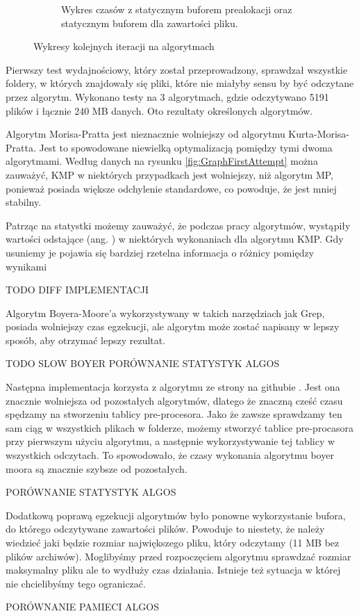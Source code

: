 \begin{figure}
\begin{subfigure}{0.8\textwidth}
    \caption{Wykres czasów z statycznym buforem prealokacji oraz statycznym buforem
    dla zawartości pliku.}
    \label{fig:GraphStaticPreallocAndFileBuffer}
\end{subfigure}
\caption{Wykresy kolejnych iteracji na algorytmach}
\label{fig:GraphsIterationComparison}
\end{figure}

Pierwszy test wydajnościowy, który został przeprowadzony, sprawdzał wszystkie 
foldery, w których znajdowały się pliki, które nie miałyby sensu by być odczytane
przez algorytm. Wykonano testy na 3 algorytmach, gdzie odczytywano 5191 plików 
i łącznie 240 MB danych. Oto rezultaty określonych algorytmów.

Algorytm Morisa-Pratta jest nieznacznie wolniejszy od algorytmu 
Kurta-Morisa-Pratta. Jest to spowodowane niewielką optymalizacją pomiędzy tymi 
dwoma algorytmami. Według danych na rysunku \ref{fig:GraphFirstAttempt} można 
zauważyć, KMP w niektórych przypadkach jest wolniejszy, niż algorytm MP, 
ponieważ posiada większe odchylenie standardowe, co powoduje, że jest mniej
stabilny. 

Patrząc na statystki możemy zauważyć, że podczas pracy algorytmów, wystąpiły 
wartości odstające (ang. ) w niektórych wykonaniach dla 
algorytmu KMP. Gdy usuniemy je pojawia się bardziej rzetelna informacja o 
różnicy pomiędzy wynikami

TODO DIFF IMPLEMENTACJI

Algorytm Boyera-Moore'a wykorzystywany w takich narzędziach jak Grep, posiada
wolniejszy czas egzekucji, ale algorytm może zostać napisany w lepszy sposób, 
aby otrzymać lepszy rezultat.

TODO SLOW BOYER
PORÓWNANIE STATYSTYK ALGOS

Następna implementacja korzysta z algorytmu ze strony na githubie 
\cite{bib:internet:BoyerMooreGit}. Jest ona znacznie wolniejsza od pozostałych
algorytmów, dlatego że znaczną cześć czasu spędzamy na stworzeniu tablicy
pre-procesora. Jako że zawsze sprawdzamy ten sam ciąg w wszystkich plikach w
folderze, możemy stworzyć tablice pre-procasora przy pierwszym użyciu algorytmu,
a następnie wykorzystywanie tej tablicy w wszystkich odczytach. To spowodowało, 
że czasy wykonania algorytmu boyer moora są znacznie szybsze od pozostałych.

PORÓWNANIE STATYSTYK ALGOS

Dodatkową poprawą egzekucji algorytmów było ponowne wykorzystanie bufora, do 
którego odczytywane zawartości plików. Powoduje to niestety, że należy wiedzieć
jaki będzie rozmiar największego pliku, który odczytamy (11 MB bez plików 
archiwów). Moglibyśmy przed rozpoczęciem algorytmu sprawdzać rozmiar maksymalny 
pliku ale to wydłuży czas działania. Istnieje też sytuacja w której nie 
chcielibyśmy tego ograniczać. 

PORÓWNANIE PAMIECI ALGOS

